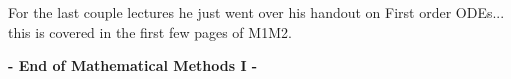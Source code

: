 \documentclass[twoside]{scrartcl}
\begin{document}





















For the last couple lectures he just went over his handout on First order ODEs... this is covered in the first few pages of M1M2. 

  \begin{center}
  \textsf{\textbf{- End of Mathematical Methods I -}}	
  \end{center}
  
  
  
\end{document}
